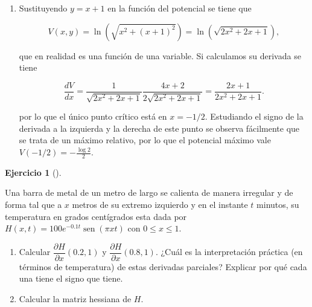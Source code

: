 \documentclass[
  spanish,
  a4paper,
]{scrreport}
\theoremstyle{definition}
\newtheorem{exercise}{Ejercicio}[chapter]
\theoremstyle{remark}
\begin{document}
\begin{tcolorbox}
\begin{enumerate}
  Podríamos haber llegado a este mismo resultado haciendo el cambio a
  coordenadas polares directamente en la función del potencial ya que
  \(V(r,\theta) = \ln(r)\).

  A partir de aquí, obtener la matriz hessiana resulta más sencillo.

  \[
  \nabla ^2 V(r,\theta) = 
  \begin{pmatrix}
  \frac{-1}{r^2} & 0 \\
  0 & 0 
  \end{pmatrix}
  \]
\item
  Sustituyendo \(y=x+1\) en la función del potencial se tiene que

  \[
  V(x,y) 
  = \ln(\sqrt{x^2+(x+1)^2}) 
  = \ln(\sqrt{2x^2 + 2x + 1}),
  \]

  que en realidad es una función de una variable. Si calculamos su
  derivada se tiene

  \[
  \frac{dV}{dx} 
  = \frac{1}{\sqrt{2x^2 + 2x + 1}}\frac{4x+2}{2\sqrt{2x^2 + 2x + 1}} 
  = \frac{2x+1}{2x^2+2x+1}.
  \]

  por lo que el único punto crítico está en \(x=-1/2\). Estudiando el
  signo de la derivada a la izquierda y la derecha de este punto se
  observa fácilmente que se trata de un máximo relativo, por lo que el
  potencial máximo vale \(V(-1/2)= -\frac{\log 2}{2}\).
\end{enumerate}

\end{tcolorbox}

\begin{exercise}[]\protect\hypertarget{exr-barra-metal}{}\label{exr-barra-metal}

Una barra de metal de un metro de largo se calienta de manera irregular
y de forma tal que a \(x\) metros de su extremo izquierdo y en el
instante \(t\) minutos, su temperatura en grados centígrados esta dada
por \(H(x,t) = 100e^{-0.1t}\operatorname{sen}(\pi xt)\) con
\(0\leq x \leq 1\).

\begin{enumerate}
\def\labelenumi{\alph{enumi}.}
\item
  Calcular \(\dfrac{\partial H}{\partial x}(0.2, 1)\) y
  \(\dfrac{\partial H}{\partial x}(0.8, 1).\) ¿Cuál es la interpretación
  práctica (en términos de temperatura) de estas derivadas parciales?
  Explicar por qué cada una tiene el signo que tiene.
\item
  Calcular la matriz hessiana de \(H\).
\end{enumerate}

\end{exercise}
\end{document}

